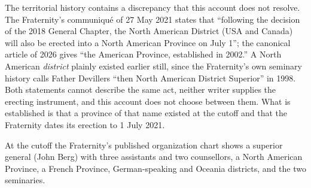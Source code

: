 The territorial history contains a discrepancy that this account does not
resolve. The Fraternity's communiqué of 27 May 2021 states that
``following the decision of the 2018 General Chapter, the North American
District (USA and Canada) will also be erected into a North American
Province on July 1''; the canonical article of 2026 gives ``the American
Province, established in 2002.'' A North American \emph{district} plainly
existed earlier still, since the Fraternity's own seminary history calls
Father Devillers ``then North American District Superior'' in 1998. Both
statements cannot describe the same act, neither writer supplies the
erecting instrument, and this account does not choose between them. What
is established is that a province of that name existed at the cutoff and
that the Fraternity dates its erection to 1 July 2021.

At the cutoff the Fraternity's published organization chart shows a
superior general (John Berg) with three assistants and two counsellors, a
North American Province, a French Province, German-speaking and Oceania
districts, and the two seminaries.
